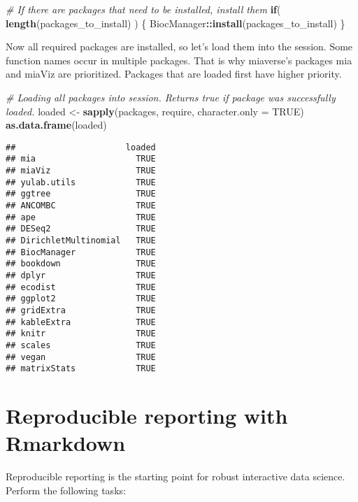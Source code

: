 \documentclass[
  oneside]{book}
\newenvironment{Shaded}{\begin{snugshade}}{\end{snugshade}}
\newcommand{\CommentTok}[1]{\textcolor[rgb]{0.56,0.35,0.01}{\textit{#1}}}
\newcommand{\ControlFlowTok}[1]{\textcolor[rgb]{0.13,0.29,0.53}{\textbf{#1}}}
\newcommand{\DataTypeTok}[1]{\textcolor[rgb]{0.13,0.29,0.53}{#1}}
\newcommand{\KeywordTok}[1]{\textcolor[rgb]{0.13,0.29,0.53}{\textbf{#1}}}
\newcommand{\NormalTok}[1]{#1}
\newcommand{\OperatorTok}[1]{\textcolor[rgb]{0.81,0.36,0.00}{\textbf{#1}}}
\newcommand{\OtherTok}[1]{\textcolor[rgb]{0.56,0.35,0.01}{#1}}
\newcommand{\StringTok}[1]{\textcolor[rgb]{0.31,0.60,0.02}{#1}}
\begin{document}
\begin{Shaded}
\begin{Highlighting}[]
\CommentTok{\# If there are packages that need to be installed, install them }
\ControlFlowTok{if}\NormalTok{( }\KeywordTok{length}\NormalTok{(packages\_to\_install) ) \{}
\NormalTok{   BiocManager}\OperatorTok{::}\KeywordTok{install}\NormalTok{(packages\_to\_install)}
\NormalTok{\}}
\end{Highlighting}
\end{Shaded}

Now all required packages are installed, so let's load them into the session.
Some function names occur in multiple packages. That is why miaverse's packages
mia and miaViz are prioritized. Packages that are loaded first have higher priority.

\begin{Shaded}
\begin{Highlighting}[]
\CommentTok{\# Loading all packages into session. Returns true if package was successfully loaded.}
\NormalTok{loaded \textless{}{-}}\StringTok{ }\KeywordTok{sapply}\NormalTok{(packages, require, }\DataTypeTok{character.only =} \OtherTok{TRUE}\NormalTok{)}
\KeywordTok{as.data.frame}\NormalTok{(loaded)}
\end{Highlighting}
\end{Shaded}

\begin{verbatim}
##                      loaded
## mia                    TRUE
## miaViz                 TRUE
## yulab.utils            TRUE
## ggtree                 TRUE
## ANCOMBC                TRUE
## ape                    TRUE
## DESeq2                 TRUE
## DirichletMultinomial   TRUE
## BiocManager            TRUE
## bookdown               TRUE
## dplyr                  TRUE
## ecodist                TRUE
## ggplot2                TRUE
## gridExtra              TRUE
## kableExtra             TRUE
## knitr                  TRUE
## scales                 TRUE
## vegan                  TRUE
## matrixStats            TRUE
\end{verbatim}

\hypertarget{reproducible-reporting-with-rmarkdown}{%
\chapter{Reproducible reporting with Rmarkdown}\label{reproducible-reporting-with-rmarkdown}}

Reproducible reporting is the starting point for robust interactive
data science. Perform the following tasks:
\end{document}
